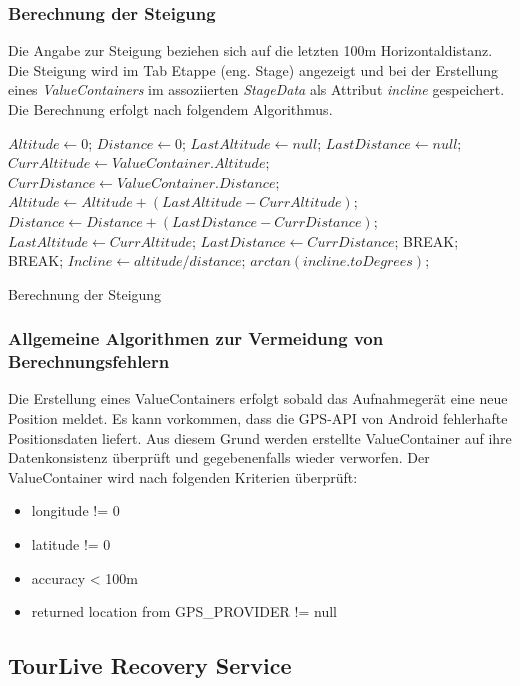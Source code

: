 \subsubsection{Berechnung der Steigung}
Die Angabe zur Steigung beziehen sich auf die letzten 100m Horizontaldistanz. Die Steigung wird im Tab Etappe (eng. Stage) angezeigt und bei der Erstellung eines \textit{ValueContainers} im assoziierten \textit{StageData} als Attribut \textit{incline} gespeichert. Die Berechnung erfolgt nach folgendem Algorithmus.


\begin{algorithm}[H]
\begin{algorithmic}[1]
\vspace{5pt}
\State $Altitude \gets 0$;
\State $Distance \gets 0$;
\State $LastAltitude \gets null$;
\State $LastDistance \gets null$;
\State $CurrAltitude \gets ValueContainer.Altitude$;
\State $CurrDistance \gets ValueContainer.Distance$;
\State $Altitude \gets Altitude + (LastAltitude - CurrAltitude)$;
\State $Distance \gets Distance + (LastDistance - CurrDistance)$;
\EndIf
\State $LastAltitude \gets CurrAltitude$;
\State $LastDistance \gets CurrDistance$;
\State BREAK;
\EndIf
\Else
\State BREAK;
\EndIf
\EndFor
\State $Incline \gets altitude/distance$;
\State \Return $arctan(incline.toDegrees)$;
\end{algorithmic}
\caption{Berechnung der Steigung}
\end{algorithm}

\subsubsection{Allgemeine Algorithmen zur Vermeidung von Berechnungsfehlern}
Die Erstellung eines ValueContainers erfolgt sobald das Aufnahmegerät eine neue Position meldet. Es kann vorkommen, dass die GPS-API von Android fehlerhafte Positionsdaten liefert. Aus diesem Grund werden erstellte ValueContainer auf ihre Datenkonsistenz überprüft und gegebenenfalls wieder verworfen. Der ValueContainer wird nach folgenden Kriterien überprüft:
\begin{itemize} [noitemsep,topsep=0pt]
\item longitude != 0
\item latitude != 0
\item accuracy < 100m
\item returned location from GPS\_PROVIDER != null
\end{itemize}

\subsection{TourLive Recovery Service}
